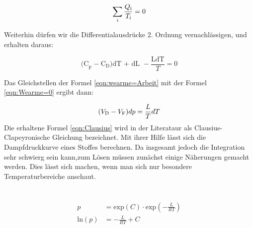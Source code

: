 \begin{equation}
    \sum_{i}\frac{Q_\text{i}}{T_\text{i}}=0\nonumber\\
    \label{eqn:sum1}
\end{equation}

Weiterhin dürfen wir die Differentialausdrücke 2. Ordnung vernachlässigen, und erhalten daraus:

\begin{equation}
    \text{(C}_\text{F} - \text{C}_\text{D}\text{)dT + dL }-\frac{\text{LdT}}{T}= 0
    \label{eqn:Wearme=0}
\end{equation}

Das Gleichstellen der Formel \eqref{eqn:wearme=Arbeit} mit der Formel \eqref{eqn:Wearme=0} ergibt dann:

\begin{equation}
    (V_\text{D}-V_\text{F})dp =\frac{L}{T}dT\\
    \label{eqn:Clausius}
\end{equation}
Die erhaltene Formel \eqref{eqn:Clausius} wird in der Literataur als Clausius-Clapeyronische Gleichung bezeichnet. Mit ihrer Hilfe 
lässt sich die Dampfdruckkurve eines Stoffes berechnen. Da insgesamt jedoch die Integration sehr schwierg sein kann,zum Lösen müssen 
zunächst einige Näherungen gemacht werden. Dies lässt sich machen, wenn man sich nur besondere Temperaturbereiche anschaut.
\\
\\
\\

\begin{align}
p &= \text{exp}(C)\cdot \text{exp}\left(-\frac{L}{RT}\right)\\
\text{ln}(p)&= -\frac{L}{RT} + C
\end{align}

